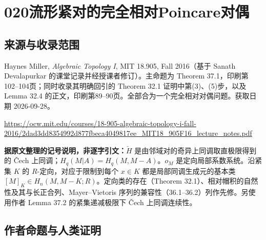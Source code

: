 \documentclass[UTF8,11pt]{ctexart}
\theoremstyle{definition}
\begin{document}
\section*{020\quad 流形紧对的完全相对Poincare对偶}
\subsection*{来源与收录范围}
Haynes Miller, \emph{Algebraic Topology I}, MIT 18.905, Fall 2016（基于 Sanath Devalapurkar 的课堂记录并经授课者修订）。主命题为 Theorem 37.1，印刷第102--104页；同时收录其明确回引的 Theorem 32.1 证明中第(3)、(5)步，以及 Lemma 32.4 的正文，印刷第89--90页。全部合为一个完全相对对偶问题。获取日期 2026-09-28。
\par\url{https://ocw.mit.edu/courses/18-905-algebraic-topology-i-fall-2016/2dad3dd8354992d877fbeca4049817ee_MIT18_905F16_lecture_notes.pdf}
\par\textbf{据原文整理的记号说明，非逐字引文：}$\check H$ 是由邻域对的奇异上同调取直极限得到的 \v Cech 上同调；$H_q(M|A)=H_q(M,M-A)$。$o_M$ 是定向局部系数系统。沿紧集 $K$ 的 $R$-定向，对应于限制到每个 $x\in K$ 都是局部同调生成元的基本类 $[M]_K\in H_n(M,M-K;R)$。定向类的存在（Theorem 32.1）、相对帽积的自然性及其与长正合列、Mayer--Vietoris 序列的兼容性（36.1--36.2）列作先修。另使用作者 Lemma 37.2 的紧集递减极限下 \v Cech 上同调连续性。
\subsection*{作者命题与人类证明}
\end{document}
